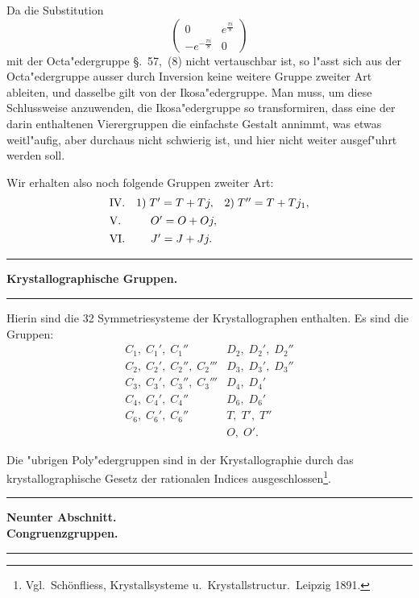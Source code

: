 \documentclass[12pt,a4paper]{article}
\theoremstyle{plain}
\theoremstyle{definition}
\theoremstyle{remark}
\begin{document}
Da die Substitution
\[
\begin{pmatrix} 0 & e^{\frac{\pi i}{8}} \\ -e^{-\frac{\pi i}{8}} & 0 \end{pmatrix}
\]
mit der Octa"edergruppe \S.~57,~(8) nicht vertauschbar ist, so l"asst sich aus der Octa"edergruppe ausser durch Inversion keine weitere Gruppe zweiter Art ableiten, und dasselbe gilt von der Ikosa"edergruppe. Man muss, um diese Schlussweise anzuwenden, die Ikosa"edergruppe so transformiren, dass eine der darin enthaltenen Vierergruppen die einfachste Gestalt annimmt, was etwas weitl"aufig, aber durchaus nicht schwierig ist, und hier nicht weiter ausgef"uhrt werden soll.

Wir erhalten also noch folgende Gruppen zweiter Art:
\[
\begin{array}{lll}
\text{IV.} & \text{1)}\; T' = T + Tj, & \text{2)}\; T'' = T + Tj_{1}, \\[4pt]
\text{V.} & \multicolumn{2}{l}{\quad\; O' = O + Oj,} \\[4pt]
\text{VI.} & \multicolumn{2}{l}{\quad\; J' = J + Jj.}
\end{array}
\]

\medskip\noindent\rule{\textwidth}{0.4pt}
\begin{center}\textbf{Krystallographische Gruppen.}\end{center}
\noindent\rule{\textwidth}{0.4pt}

Hierin sind die 32 Symmetriesysteme der Krystallographen enthalten. Es sind die Gruppen:
\[
\begin{array}{ll}
C_{1},\; C_{1}',\; C_{1}'' & D_{2},\; D_{2}',\; D_{2}'' \\[3pt]
C_{2},\; C_{2}',\; C_{2}'',\; C_{2}''' & D_{3},\; D_{3}',\; D_{3}'' \\[3pt]
C_{3},\; C_{3}',\; C_{3}'',\; C_{3}''' & D_{4},\; D_{4}' \\[3pt]
C_{4},\; C_{4}',\; C_{4}'' & D_{6},\; D_{6}' \\[3pt]
C_{6},\; C_{6}',\; C_{6}'' & T,\; T',\; T'' \\[3pt]
& O,\; O'.
\end{array}
\]

Die "ubrigen Poly"edergruppen sind in der Krystallographie durch das krystallographische Gesetz der rationalen Indices ausgeschlossen\footnote{Vgl.\ Sch\"onfliess, Krystallsysteme u.\ Krystallstructur.\ Leipzig 1891.}.

\newpage
\noindent\rule{\textwidth}{0.4pt}
\begin{center}\textbf{Neunter Abschnitt.}\\[4pt]\textbf{Congruenzgruppen.}\end{center}
\noindent\rule{\textwidth}{0.4pt}
\end{document}
